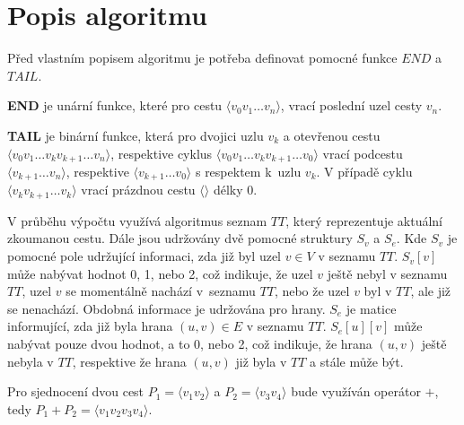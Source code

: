     \section{Popis algoritmu}
        Před vlastním popisem algoritmu je potřeba definovat pomocné funkce $\mathit{END}$ a $\mathit{TAIL}$.

        \begin{definition}
            \label{def:end}
            \textbf{END} je unární funkce, které pro cestu $\langle v_0 v_1 \dots v_n \rangle$, vrací poslední uzel cesty $v_n$.
        \end{definition}

        \begin{definition}
            \textbf{TAIL} je binární funkce, která pro dvojici uzlu $v_k$ a otevřenou cestu $\langle v_0 v_1 \dots v_k v_{k+1} \dots v_n \rangle$, respektive cyklus $\langle v_0 v_1 \dots v_k v_{k+1} \dots v_0 \rangle$ vrací podcestu $\langle v_{k+1} \dots v_n \rangle$, respektive $\langle v_{k+1} \dots v_0 \rangle$ s respektem k~uzlu $v_k$. V případě cyklu $\langle v_k v_{k+1} \dots v_k \rangle$ vrací prázdnou cestu $\langle \rangle$ délky 0.
        \end{definition}

        \vspace*{1em}
        V průběhu výpočtu využívá algoritmus seznam $TT$, který reprezentuje aktuální zkoumanou cestu. Dále jsou udržovány dvě pomocné struktury $S_v$ a $S_e$. Kde $S_v$ je pomocné pole udržující informaci, zda již byl uzel $v \in V$ v seznamu $TT$. $S_v[v]$ může nabývat hodnot 0, 1, nebo 2, což indikuje, že uzel $v$ ještě nebyl v seznamu $TT$, uzel $v$ se momentálně nachází v~seznamu $TT$, nebo že uzel $v$ byl v $TT$, ale již se nenachází. Obdobná informace je udržována pro hrany. $S_e$ je matice informující, zda již byla hrana $(u, v) \in E$ v seznamu $TT$. $S_e[u][v]$ může nabývat pouze dvou hodnot, a to 0, nebo 2, což indikuje, že hrana $(u, v)$ ještě nebyla v $TT$, respektive že hrana $(u, v)$ již byla v $TT$ a stále může být.

        Pro sjednocení dvou cest $P_1 = \langle v_1v_2 \rangle$ a $P_2 = \langle v_3v_4 \rangle$ bude využíván operátor $+$, tedy $P_1 + P_2 = \langle v_1v_2v_3v_4 \rangle$.

